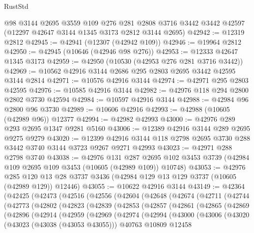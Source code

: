 \begin{lexlean}{RustStd}
\begin{coremodule}
    @98
    @3144
    @2695
    @3559
    @109
    @276
    @281
    @2808
    @3716
    @3442
    @3442
    @42597
    (@12297 @42647 @3144 @1345 @3173 @2812 @3144 @2695)
@42942 := @12319 @2812
@42945 := @42941 (@12307 (@42942 @109))
@42946 := @19964 @2812
@42950 := @42945 (@10646 (@42946 @98 @276))
@42953 := @12333 @42647 @1345 @3173
@42959 := @42950 (@10530 (@42953 @276 @281 @3716 @3442))
@42969 := @10562 @42916 @3144 @2686 @295 @2803 @2695 @3442 @42595 @3144 @2814
@42971 := @10576 @42916 @3144
@42974 := @42971 @295 @2803 @42595
@42976 := @10585 @42916 @3144
@42982 := @42976 @118 @294 @2800 @2802 @3730 @42594
@42984 := @10597 @42916 @3144
@42988 := @42984 @96 @2800 @96 @3730
@42989 := @10606 @42916
@42993 := @42988 (@10605 (@42989 @96)) @12377
@42994 := @42982 @42993
@43000 := @42976 @289 @293 @2695 @1347 @9281 @5160
@43006 := @12389 @42916 @3144 @289 @2695 @9275 @9279
@43020 := @12399 @42916 @3144 @118 @2798 @2695 @3730 @288 @3442 @3740 @3144 @3723 @9267 @9271 @42993
@43023 := @42971 @288 @2798 @3740
@43038 := @42976
    @131
    @287
    @2695
    @102
    @3453
    @3739
    (@42984 @109 @2695 @109 @3453 (@10605 (@42989 @109)) @10748)
@43053 := @42976
    @285
    @120
    @13
    @28
    @3737
    @3436
    (@42984 @129 @13 @129 @3737 (@10605 (@42989 @129)) @12446)
@43055 := @10622 @42916 @3144
@43149 := @42364
    (@42425
      (@42473
        (@42516
          (@42556
            (@42604
              (@42648
                (@42674
                  (@42711
                    (@42744
                      (@42773
                        (@42802
                          (@42823
                            (@42839
                              (@42853
                                (@42857
                                  (@42861
                                    (@42865
                                      (@42869
                                        (@42896
                                          (@42914
                                            (@42959
                                              (@42969
                                                (@42974
                                                  (@42994
                                                    (@43000
                                                      (@43006
                                                        (@43020
                                                          (@43023 (@43038 (@43053 @43055)))
                                                          @40763
                                                          @10809
                                                          @12458

\end{coremodule}
\end{lexlean}
